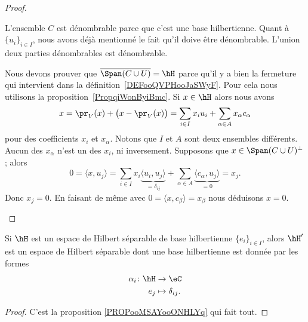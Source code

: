 \begin{proof}
\begin{subproof}

		L'ensemble \( C\) est dénombrable parce que c'est une base hilbertienne. Quant à \( \{ u_i \}_{i\in I}\), nous avons déjà mentionné le fait qu'il doive être dénombrable. L'union deux parties dénombrables est dénombrable.


		Nous devons prouver que \( \overline{ \Span(C\cup U) }=\hH\) parce qu'il y a bien la fermeture qui intervient dans la définition~\ref{DEFooQVPHooJaSWyF}. Pour cela nous utilisons la proposition~\ref{PropqiWonByiBmc}.
		Si \( x\in \hH\) alors nous avons
		\begin{equation}
			x=\pr_V(x)+\big( x-\pr_V(x) \big)=\sum_{i\in I}x_iu_i+\sum_{\alpha\in A}x_{\alpha}c_{\alpha}
		\end{equation}
		pour des coefficients \( x_i\) et \( x_{\alpha}\). Notons que \( I\) et \( A\) sont deux ensembles différents. Aucun des \( x_{\alpha}\) n'est un des \( x_i\), ni inversement. Supposons que \( x\in \Span(C\cup U)^{\perp}\); alors
		\begin{equation}
			0=\langle x, u_j\rangle =\sum_{i\in I}x_i\underbrace{\langle u_i, u_j\rangle }_{=\delta_{ij}}+\sum_{\alpha\in A}\underbrace{\langle c_{\alpha}, u_j\rangle }_{=0}=x_j.
		\end{equation}
		Donc \( x_j=0\). En faisant de même avec \( 0=\langle x, c_{\beta}\rangle =x_{\beta}\) nous déduisons \( x=0\).
	\end{subproof}
\end{proof}

\begin{proposition}      \label{PROPooZQIAooUEWLtg}
	Si \( \hH\) est un espace de Hilbert séparable de base hilbertienne \( \{ e_i \}_{i\in I}\), alors \( \hH'\) est un espace de Hilbert séparable dont une base hilbertienne est donnée par les formes
	\begin{equation}
		\begin{aligned}
			\alpha_i\colon \hH & \to \eC              \\
			e_j                & \mapsto \delta_{ij}.
		\end{aligned}
	\end{equation}
\end{proposition}

\begin{proof}
	C'est la proposition \ref{PROPooMSAYooONHLYq} qui fait tout.
\end{proof}

